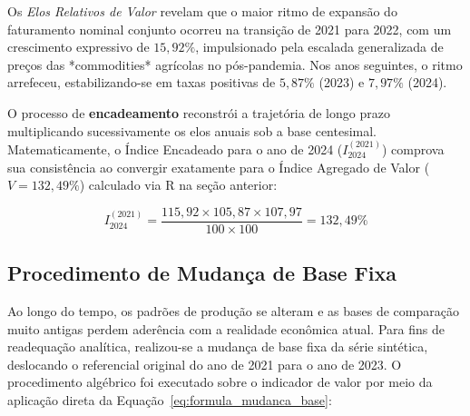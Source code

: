\documentclass[12pt,a4paper]{article}
\begin{document}
\begin{table}[htbp]
\centering
\caption{Série Histórica, Elos Relativos e Encadeamento do Valor Setorial (Brasil, 2021–2024).}
\label{tab:serie_historica_valor}
\end{table}

Os \textit{Elos Relativos de Valor} revelam que o maior ritmo de expansão do faturamento nominal conjunto ocorreu na transição de 2021 para 2022, com um crescimento expressivo de $15,92\%$, impulsionado pela escalada generalizada de preços das *commodities* agrícolas no pós-pandemia. Nos anos seguintes, o ritmo arrefeceu, estabilizando-se em taxas positivas de $5,87\%$ (2023) e $7,97\%$ (2024). 

O processo de \textbf{encadeamento} reconstrói a trajetória de longo prazo multiplicando sucessivamente os elos anuais sob a base centesimal. Matematicamente, o Índice Encadeado para o ano de 2024 ($I_{2024}^{(2021)}$) comprova sua consistência ao convergir exatamente para o Índice Agregado de Valor ($V = 132,49\%$) calculado via R na seção anterior:

\begin{equation}
I_{2024}^{(2021)} = \frac{115,92 \times 105,87 \times 107,97}{100 \times 100} = 132,49\%
\end{equation}

\subsection{Procedimento de Mudança de Base Fixa}

Ao longo do tempo, os padrões de produção se alteram e as bases de comparação muito antigas perdem aderência com a realidade econômica atual. Para fins de readequação analítica, realizou-se a mudança de base fixa da série sintética, deslocando o referencial original do ano de 2021 para o ano de 2023. O procedimento algébrico foi executado sobre o indicador de valor por meio da aplicação direta da Equação~\ref{eq:formula_mudanca_base}:
\end{document}
